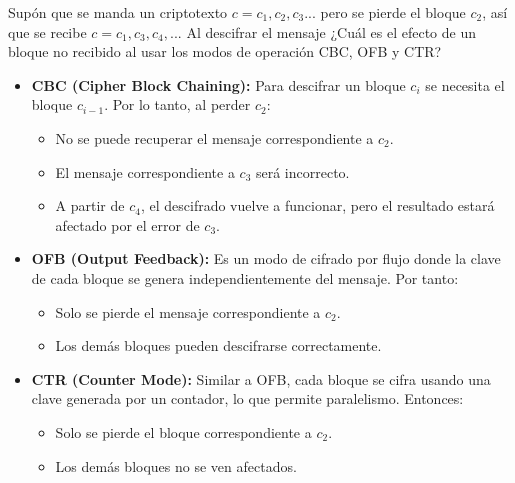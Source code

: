 Supón que se manda un criptotexto $c = c_1,c_2,c_3...$ pero se pierde el bloque $c_2$, así que se recibe $c=c_1,c_3,c_4,...$ Al descifrar el mensaje ¿Cuál es el efecto de un bloque no recibido al usar los modos de operación CBC, OFB y CTR?

\begin{itemize}
    \item \textbf{CBC (Cipher Block Chaining):} Para descifrar un bloque $c_i$ se necesita el bloque $c_{i-1}$. Por lo tanto, al perder $c_2$:
    \begin{itemize}
        \item No se puede recuperar el mensaje correspondiente a $c_2$.
        \item El mensaje correspondiente a $c_3$ será incorrecto.
        \item A partir de $c_4$, el descifrado vuelve a funcionar, pero el resultado estará afectado por el error de $c_3$.
    \end{itemize}

    \item \textbf{OFB (Output Feedback):} Es un modo de cifrado por flujo donde la clave de cada bloque se genera independientemente del mensaje. Por tanto:
    \begin{itemize}
        \item Solo se pierde el mensaje correspondiente a $c_2$.
        \item Los demás bloques pueden descifrarse correctamente.
    \end{itemize}

    \item \textbf{CTR (Counter Mode):} Similar a OFB, cada bloque se cifra usando una clave generada por un contador, lo que permite paralelismo. Entonces:
    \begin{itemize}
        \item Solo se pierde el bloque correspondiente a $c_2$.
        \item Los demás bloques no se ven afectados.
    \end{itemize}
\end{itemize}
